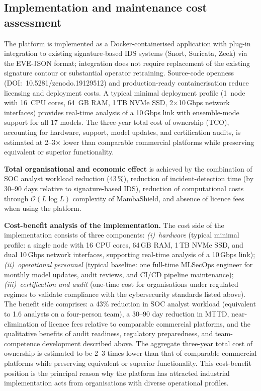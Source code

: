 \subsection{Implementation and maintenance cost assessment}

The platform is implemented as a Docker-containerised application with
plug-in integration to existing signature-based IDS systems (Snort,
Suricata, Zeek) via the EVE-JSON format; integration does not require
replacement of the existing signature contour or substantial operator
retraining. Source-code openness (DOI:~10.5281/zenodo.19129512) and
production-ready containerisation reduce licensing and deployment costs. A typical minimal deployment profile (1~node with 16~CPU cores, 64~GB RAM, 1\,TB NVMe SSD, 2$\times$10\,Gbps network interfaces) provides real-time analysis of a 10\,Gbps link with ensemble-mode support for all 17 models. The three-year total cost of ownership (TCO), accounting for hardware, support, model updates, and certification audits, is estimated at 2--3$\times$ lower than comparable commercial platforms while preserving equivalent or superior functionality.

\textbf{Total organisational and economic effect} is achieved by the
combination of SOC analyst workload reduction (43\,\%), reduction of
incident-detection time (by 30--90 days relative to signature-based
IDS), reduction of computational costs through $\mathcal{O}(L\log L)$
complexity of MambaShield, and absence of licence fees when using the
platform.

\noindent\textbf{Cost-benefit analysis of the implementation.} The cost side of the implementation consists of three components: \emph{(i)~hardware} (typical minimal profile: a single node with 16 CPU cores, 64\,GB RAM, 1\,TB NVMe SSD, and dual 10\,Gbps network interfaces, supporting real-time analysis of a 10\,Gbps link); \emph{(ii)~operational personnel} (typical baseline: one full-time MLSecOps engineer for monthly model updates, audit reviews, and CI/CD pipeline maintenance); \emph{(iii)~certification and audit} (one-time cost for organisations under regulated regimes to validate compliance with the cybersecurity standards listed above). The benefit side comprises: a 43\% reduction in SOC analyst workload (equivalent to 1.6 analysts on a four-person team), a 30--90 day reduction in MTTD, near-elimination of licence fees relative to comparable commercial platforms, and the qualitative benefits of audit readiness, regulatory preparedness, and team-competence development described above. The aggregate three-year total cost of ownership is estimated to be 2--3 times lower than that of comparable commercial platforms while preserving equivalent or superior functionality. This cost-benefit position is the principal reason why the platform has attracted industrial implementation acts from organisations with diverse operational profiles.

